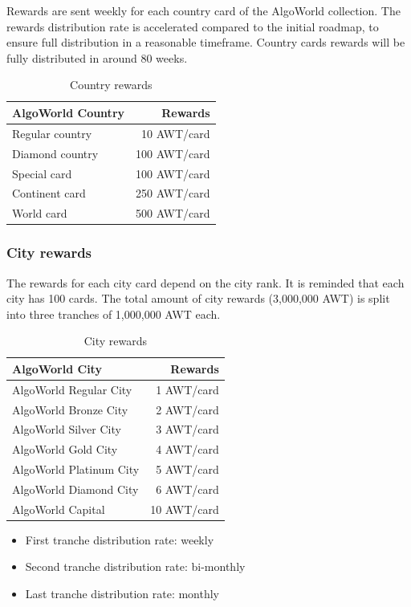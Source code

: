 \documentclass{article}
\begin{document}
Rewards are sent weekly for each country card of the AlgoWorld collection.
The rewards distribution rate is accelerated compared to the initial roadmap, to ensure full distribution in a reasonable timeframe. Country cards rewards will be fully distributed in around 80 weeks.
\begin{table}[ht]
\centering
\begin{tabular}{l|r}
AlgoWorld Country & Rewards \\\hline
Regular country & 10 AWT/card \\
Diamond country & 100 AWT/card \\
Special card & 100 AWT/card \\
Continent card & 250 AWT/card \\
World card & 500 AWT/card \\
\end{tabular}
\caption{\label{tab:widgets}Country rewards}
\end{table}

\subsubsection{City rewards}
\label{sssec:city-rewards}

The rewards for each city card depend on the city rank. It is reminded that each city has 100 cards. The total amount of city rewards (3,000,000 AWT) is split into three tranches of 1,000,000 AWT each.
\begin{table}[ht]
\centering
\begin{tabular}{l|r}
AlgoWorld City & Rewards \\\hline
AlgoWorld Regular City & 1 AWT/card \\
AlgoWorld Bronze City & 2 AWT/card \\
AlgoWorld Silver City & 3 AWT/card \\
AlgoWorld Gold City & 4 AWT/card \\
AlgoWorld Platinum City & 5 AWT/card \\
AlgoWorld Diamond City & 6 AWT/card \\
AlgoWorld Capital & 10 AWT/card \\
\end{tabular}
\caption{\label{tab:widgets}City rewards}
\end{table}

\begin{itemize}
\item First tranche distribution rate: weekly
\item Second tranche distribution rate: bi-monthly
\item Last tranche distribution rate: monthly
\end{itemize}
\end{document}
